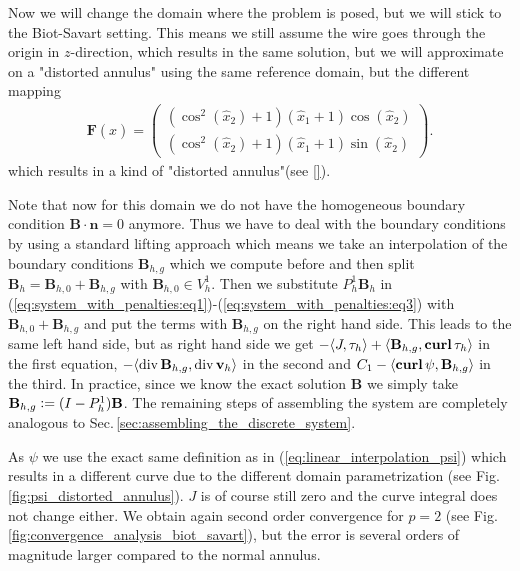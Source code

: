 \documentclass[../master_thesis.tex]{subfiles}
\begin{document}
Now we will change the domain where the problem is posed, but we will 
stick to the Biot-Savart setting. This means we still assume the wire 
goes through the origin in $z$-direction, which results in the same solution, 
but we will approximate
on a "distorted annulus" using the same reference domain, but the different mapping 
\begin{align*}
    \mathbf{F}(\hat{x}) = \begin{pmatrix}
        (\cos^2(\hat{x}_2 ) + 1 )(\hat{x}_1 + 1)\cos(\hat{x}_2 ) 
        \\ (\cos^2(\hat{x}_2 ) + 1 ) (\hat{x}_1 + 1)\sin(\hat{x}_2 ) 
    \end{pmatrix}.
\end{align*}
which results in a kind of "distorted annulus"(see \ref{}). 

Note that now for this domain we do not have 
the homogeneous boundary condition
$\mathbf{B}\cdot \mathbf{n} = 0$ anymore. Thus we have to deal with the boundary conditions 
by using a standard lifting approach which means we take an interpolation of the boundary conditions 
$\mathbf{B}_{h,g}$ which we compute before and then split
$\mathbf{B}_{h} = \mathbf{B}_{h,0} + \mathbf{B}_{h,g}$ with $\mathbf{B}_{h,0}\in V_h^1$.
Then we substitute $P_h^1 \mathbf{B}_h$ in 
(\ref{eq:system_with_penalties:eq1})-(\ref{eq:system_with_penalties:eq3}) 
with $\mathbf{B}_{h,0} + \mathbf{B}_{h,g}$ and put the terms with  
$\mathbf{B}_{h,g}$ on the right hand side. 
This leads to the same left hand side, but as right hand side we get
$-\langle J, \tau_h \rangle + \langle \mathbf{B}_{h,g}, \veccurl \tau_h \rangle$ in 
the first equation, $-\langle\operatorname{div}  \mathbf{B}_{h,g} ,\operatorname{div} \mathbf{v}_{h} \rangle$
in the second and $C_1 - \langle\veccurl \psi,\mathbf{B}_{h,g} \rangle$ 
in the third. In practice, since we know the exact solution $\mathbf{B}$ we simply take 
$\mathbf{B}_{h,g} \vcentcolon= (I-P^1_h)\mathbf{B}$. The remaining steps of assembling 
the system are completely analogous to Sec.\,\ref{sec:assembling_the_discrete_system}. 


As $\psi$ we use the exact same definition as in (\ref{eq:linear_interpolation_psi}) 
which results in a different 
curve due to the different domain parametrization (see Fig.\,\ref{fig:psi_distorted_annulus}). $J$ is of course
still zero and the curve integral does not change either. We obtain again 
second order convergence for $p=2$ (see Fig.\ref{fig:convergence_analysis_biot_savart}), 
but the error is several orders of magnitude larger compared to the normal annulus. 
\end{document}
